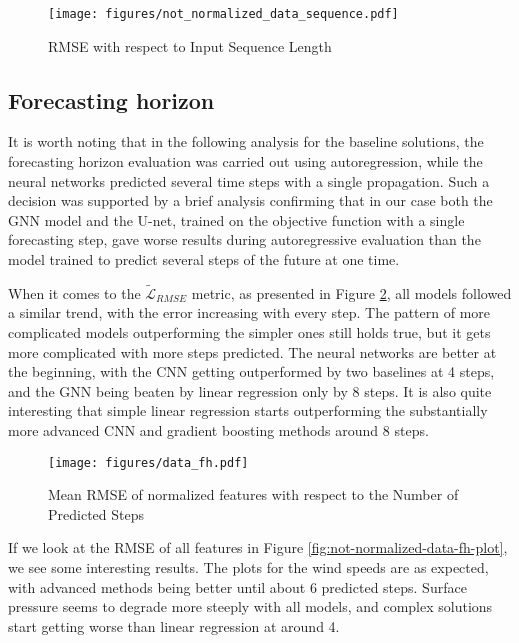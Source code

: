 \begin{figure}[!ht]
    \centering
    \texttt{[image: figures/not\_normalized\_data\_sequence.pdf]}
    \caption{RMSE with respect to Input Sequence Length}
    \label{fig:not-normalized-data-sequence-plot}
\end{figure}

\FloatBarrier

\subsection{Forecasting horizon}
It is worth noting that in the following analysis for the baseline solutions, the forecasting horizon evaluation was carried out using autoregression, while the neural networks predicted several time steps with a single propagation. Such a decision was supported by a brief analysis confirming that in our case both the GNN model and the U-net, trained on the objective function with a single forecasting step, gave worse results during autoregressive evaluation than the model trained to predict several steps of the future at one time.

When it comes to the $\tilde{\mathcal{L}}_{RMSE}$ metric, as presented in Figure \ref{fig:data-fh-plot}, all models followed a similar trend, with the error increasing with every step. The pattern of more complicated models outperforming the simpler ones still holds true, but it gets more complicated with more steps predicted. The neural networks are better at the beginning, with the CNN getting outperformed by two baselines at 4 steps, and the GNN being beaten by linear regression only by 8 steps. It is also quite interesting that simple linear regression starts outperforming the substantially more advanced CNN and gradient boosting methods around 8 steps.   
\begin{figure}[!ht]
    \centering
    \texttt{[image: figures/data\_fh.pdf]}
    \caption{Mean RMSE of normalized features with respect to the Number of Predicted Steps}
    \label{fig:data-fh-plot}
\end{figure}

If we look at the RMSE of all features in Figure \ref{fig:not-normalized-data-fh-plot}, we see some interesting results. The plots for the wind speeds are as expected, with advanced methods being better until about 6 predicted steps. Surface pressure seems to degrade more steeply with all models, and complex solutions start getting worse than linear regression at around 4.

